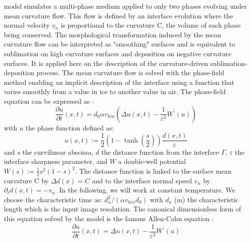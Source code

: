 \documentclass[draft,ms]{agujournal2019}
\begin{document}
 model simulates a multi-phase medium applied to only two phases evolving under mean curvature flow. This flow  is defined by an interface evolution where the normal velocity $v_n$ is proportional to the curvature C, the volume of each phase being conserved. The morphological transformation induced by the mean curvature flow can be interpreted as "smoothing" surfaces and is equivalent to sublimation on high curvature surfaces and deposition on negative curvature surfaces. It is applied here on the description of the curvature-driven sublimation-deposition process. The mean curvature flow is solved with the phase-field method enabling an implicit description of the interface using a function that varies smoothly from a value in ice to another value in air. The phase-field equation can be expressed as \cite{bretin_and_denis_discrete-continuous_2015}:\\
\begin{equation}\label{eq:phase-field}\frac{\partial u}{\partial t}(x, t)= d_0 \alpha v_{kin} \left(\Delta u(x, t)-\frac{1}{\varepsilon^{2}} W^{\prime}(u)\right)\end{equation}
\noindent with $u$ the phase function defined as: \begin{equation}\label{eq:phase-func}
u(x,t) := \frac{1}{2}\left(1-\tanh\left(\frac{s}{2}\right)\right)\frac{d(x,t)}{\varepsilon}
\end{equation}
and $s$ the curvilinear  abscissa, $d$ the distance function from the interface $\Gamma$, $\varepsilon$ the interface sharpness parameter, and $W$ a double-well potential $W(s):=\frac{1}{2} s^{2}(1-s)^{2}$. The distance function  is linked to the surface mean curvature C by $\Delta d(x) = C$ and to the interface normal speed $v_n$ by $\partial_t d (x,t) = - v_n$.
In the following, we will work at constant temperature. We choose the characteristic time as: $d_x^2 / \left(\alpha v_{kin} d_0\right)$ with $d_x$ (m) the characteristic length which is the input image resolution. The canonical dimensionless form of this equation solved by the model is the famous Allen-Cahn equation \cite{bretin_and_denis_discrete-continuous_2015, kaempfer_phase-field_2009}:
\begin{equation}\label{eq:allen-cahn}\frac{\partial u}{\partial t}(x, t)=\Delta u(x, t)-\frac{1}{\varepsilon^{2}} W^{\prime}(u)\end{equation}
\end{document}
